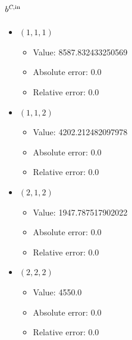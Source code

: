 \documentclass{article}%
\begin{document}
\subsection{$b^{\textsl{C},\text{in}}$}%
\begin{itemize}%
	\item $(1, 1, 1)$%
	\begin{itemize}%
		\item Value: 8587.832433250569%
		\item Absolute error: 0.0%
		\item Relative error: 0.0%
	\end{itemize}%
	\item $(1, 1, 2)$%
	\begin{itemize}%
		\item Value: 4202.212482097978%
		\item Absolute error: 0.0%
		\item Relative error: 0.0%
	\end{itemize}%
	\item $(2, 1, 2)$%
	\begin{itemize}%
		\item Value: 1947.787517902022%
		\item Absolute error: 0.0%
		\item Relative error: 0.0%
	\end{itemize}%
	\item $(2, 2, 2)$%
	\begin{itemize}%
		\item Value: 4550.0%
		\item Absolute error: 0.0%
		\item Relative error: 0.0%
	\end{itemize}%
\end{itemize}%
\end{document}
